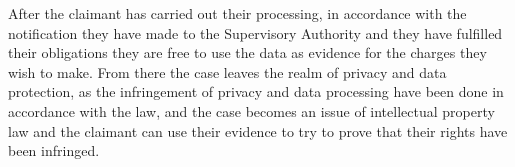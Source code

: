 After the claimant has carried out their processing, in accordance with the notification they have made to the Supervisory Authority and they have fulfilled their obligations they are free to use the data as evidence for the charges they wish to make. From there the case leaves the realm of privacy and data protection, as the infringement of privacy and data processing have been done in accordance with the law, and the case becomes an issue of intellectual property law and the claimant can use their evidence to try to prove that their rights have been infringed.


